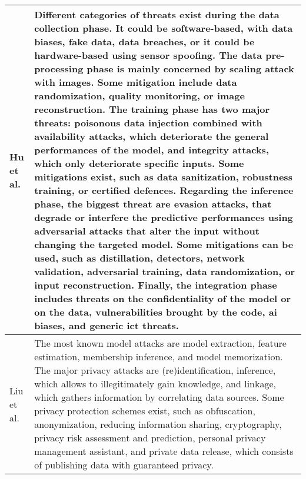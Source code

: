 \begin{small}
\begin{landscape}
\begin{longtable}{p{1.5cm}|p{20.7cm}}
		\midrule
		Hu et al. \cite{hu_artificial_2021} & Different categories of threats exist during the data collection phase. It could be software-based, with data biases, fake data, data breaches, or it could be hardware-based using sensor spoofing. The data pre-processing phase is mainly concerned by scaling attack with images. Some mitigation include data randomization, quality monitoring, or image reconstruction. The training phase has two major threats: poisonous data injection combined with availability attacks, which deteriorate the general performances of the model, and integrity attacks, which only deteriorate specific inputs. Some mitigations exist, such as data sanitization, robustness training, or certified defences. Regarding the inference phase, the biggest threat are evasion attacks, that degrade or interfere the predictive performances using adversarial attacks that alter the input without changing the targeted model. Some mitigations can be used, such as distillation, detectors, network validation, adversarial training, data randomization, or input reconstruction. Finally, the integration phase includes threats on the confidentiality of the model or on the data, vulnerabilities brought by the code, \gls{ai} biases, and generic \gls{ict} threats. \\ %
		\midrule
		Liu et al. \cite{liu_when_2021} & The most known model attacks are model extraction, feature estimation, membership inference, and model memorization. The major privacy attacks are (re)identification, inference, which allows to illegitimately gain knowledge, and linkage, which gathers information by correlating data sources. Some privacy protection schemes exist, such as obfuscation, anonymization, reducing information sharing, cryptography, privacy risk assessment and prediction, personal privacy management assistant, and private data release, which consists of publishing data with guaranteed privacy. \\ %
		\midrule

\end{longtable}
\end{landscape}
\end{small}
